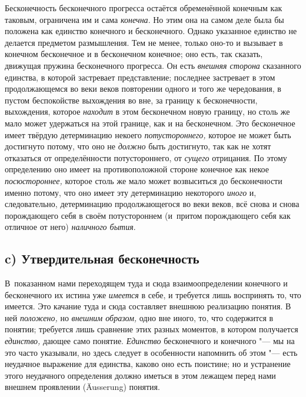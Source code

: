 Бесконечность бесконечного прогресса остаётся обременённой конечным как
таковым, ограничена им и сама {\em конечна}. Но этим
она на самом деле была бы положена как единство конечного и бесконечного.
Однако указанное единство не делается предметом размышления. Тем не менее,
только оно-то и вызывает в конечном бесконечное и в бесконечном конечное;
оно есть, так сказать, движущая пружина бесконечного прогресса. Он есть
{\em внешняя сторона} сказанного единства, в которой
застревает представление; последнее застревает в этом продолжающемся во
веки веков повторении одного и того же чередования, в пустом беспокойстве
выхождения во вне, за границу к бесконечности, выхождения, которое
{\em находит} в этом бесконечном новую границу, но
столь же мало может удержаться на этой границе, как и на бесконечном. Это
бесконечное имеет твёрдую детерминацию некоего
{\em потустороннего,} которое не может быть достигнуто
потому, что оно не {\em должно} быть достигнуто, так
как не хотят отказаться от определённости потустороннего, от
{\em сущего} отрицания. По этому определению оно имеет
на противоположной стороне конечное как некое
{\em посюстороннее,} которое столь же мало может
возвыситься до бесконечности именно потому, что оно имеет эту детерминацию
некоторого {\em иного} и, следовательно, детерминацию
продолжающегося во веки веков, всё снова и снова порождающего себя в своём
потустороннем (и~притом порождающего себя как отличное от него)
{\em наличного бытия}.

\subsection[c) Утвердительная бесконечность]{c) Утвердительная бесконечность}

В~показанном нами переходящем туда и сюда взаимоопределении конечного и
бесконечного их истина уже {\em имеется} в себе, и
требуется лишь воспринять то, что имеется. Это качание туда и сюда
составляет внешнюю реализацию понятия. В ней
{\em положено,} но {\em внешним
образом,} одно вне иного, то, что содержится в понятии; требуется лишь
сравнение этих разных моментов, в котором получается
{\em единство,} дающее само понятие.
{\em Единство} бесконечного и конечного "--- мы на это
часто указывали, но здесь следует в особенности напомнить об этом "--- есть
неудачное выражение для единства, каково оно есть поистине; но и устранение
этого неудачного определения должно иметься в этом лежащем перед нами
внешнем проявлении (Äusserung) понятия.

